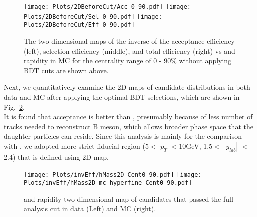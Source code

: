 \begin{figure}[h]
\begin{center}
\texttt{[image: Plots/2DBeforeCut/Acc\_0\_90.pdf]}
\texttt{[image: Plots/2DBeforeCut/Sel\_0\_90.pdf]}
\texttt{[image: Plots/2DBeforeCut/Eff\_0\_90.pdf]}
\caption{The two dimensional maps of the inverse of the acceptance efficiency (left), selection efficiency (middle), and total efficiency (right) vs \Bplus \pt and rapidity in MC for the centrality range of 0 - 90\% without applying BDT cuts are shown above.}
\label{fig:2DBeforeCut}
\end{center}
\end{figure}


Next, we quantitatively examine the 2D maps of candidate distributions in both data and MC after applying the optimal BDT selections, which are shown in Fig.~\ref{fig:2Dmap}. \\
It is found that \Bplus acceptance is better than \Bs, presumably because of less number of tracks needed to reconstruct B meson, which allows broader phase space that the daughter particles can reside. Since this analysis is mainly for the comparison with \Bs, we adopted more strict fiducial region ($5<$ $p_{T}$ $<10$GeV, 1.5$<$ $|y_{lab}|$ $<$2.4) that is defined using \Bs 2D map. \\

\begin{figure}[h]
\begin{center}
\texttt{[image: Plots/invEff/hMass2D\_Cent0-90.pdf]}
\texttt{[image: Plots/invEff/hMass2D\_mc\_hyperfine\_Cent0-90.pdf]}
\caption{\Bplus \pt and rapidity two dimensional map of candidates that passed the full analysis cut in data (Left) and MC (right).}
\label{fig:2Dmap}
\end{center}
\end{figure}

\clearpage
